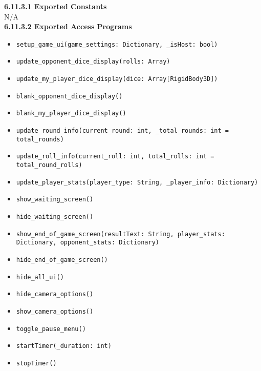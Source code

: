 \documentclass[12pt, titlepage]{article}
\begin{document}
\noindent \textbf{6.11.3.1 Exported Constants}\\
N/A\\

\textbf{6.11.3.2 Exported Access Programs}
\begin{itemize}
	\item \texttt{setup\_game\_ui(game\_settings: Dictionary, \_isHost: bool)}
	\item \texttt{update\_opponent\_dice\_display(rolls: Array)}
	\item \texttt{update\_my\_player\_dice\_display(dice: Array[RigidBody3D])}
	\item \texttt{blank\_opponent\_dice\_display()}
	\item \texttt{blank\_my\_player\_dice\_display()}
	\item \texttt{update\_round\_info(current\_round: int, \_total\_rounds: int = total\_rounds)}
	\item \texttt{update\_roll\_info(current\_roll: int, total\_rolls: int = total\_round\_rolls)}
	\item \texttt{update\_player\_stats(player\_type: String, \_player\_info: Dictionary) } 
	\item \texttt{show\_waiting\_screen() } 
	\item \texttt{hide\_waiting\_screen() } 
	\item \texttt{show\_end\_of\_game\_screen(resultText: String, player\_stats: Dictionary, opponent\_stats: Dictionary) } 
	\item \texttt{hide\_end\_of\_game\_screen() } 
	\item \texttt{hide\_all\_ui() } 
	\item \texttt{hide\_camera\_options()  }
	\item \texttt{show\_camera\_options()  }
	\item \texttt{toggle\_pause\_menu() }
	\item \texttt{startTimer(\_duration: int)  }
	\item \texttt{stopTimer() }
	
	
	
\end{itemize}
\end{document}
